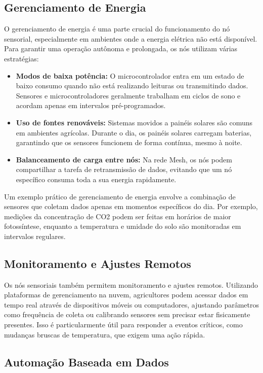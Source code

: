 \subsection{Gerenciamento de Energia}

O gerenciamento de energia é uma parte crucial do funcionamento do nó sensorial, especialmente em ambientes onde a energia elétrica não está disponível. Para garantir uma operação autônoma e prolongada, os nós utilizam várias estratégias:
\begin{itemize}
    \item \textbf{Modos de baixa potência:} O microcontrolador entra em um estado de baixo consumo quando não está realizando leituras ou transmitindo dados. Sensores e microcontroladores geralmente trabalham em ciclos de sono e acordam apenas em intervalos pré-programados.
    \item \textbf{Uso de fontes renováveis:} Sistemas movidos a painéis solares são comuns em ambientes agrícolas. Durante o dia, os painéis solares carregam baterias, garantindo que os sensores funcionem de forma contínua, mesmo à noite.
    \item \textbf{Balanceamento de carga entre nós:} Na rede Mesh, os nós podem compartilhar a tarefa de retransmissão de dados, evitando que um nó específico consuma toda a sua energia rapidamente.
\end{itemize}

Um exemplo prático de gerenciamento de energia envolve a combinação de sensores que coletam dados apenas em momentos específicos do dia. Por exemplo, medições da concentração de CO2 podem ser feitas em horários de maior fotossíntese, enquanto a temperatura e umidade do solo são monitoradas em intervalos regulares.

\subsection{Monitoramento e Ajustes Remotos}

Os nós sensoriais também permitem monitoramento e ajustes remotos. Utilizando plataformas de gerenciamento na nuvem, agricultores podem acessar dados em tempo real através de dispositivos móveis ou computadores, ajustando parâmetros como frequência de coleta ou calibrando sensores sem precisar estar fisicamente presentes. Isso é particularmente útil para responder a eventos críticos, como mudanças bruscas de temperatura, que exigem uma ação rápida.

\subsection{Automação Baseada em Dados}

